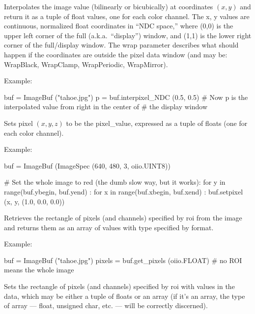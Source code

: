 Interpolates the image value (bilinearly or bicubically)
at coordinates $(x,y)$ and return it as a tuple
of {\cf float} values, one for each color channel.  The {\cf x, y} values
are continuous, normalized {\cf float} coordinates in ``NDC space,'' where
{\cf (0,0)} is the upper left corner of the full (a.k.a.\ ``display'')
window, and {\cf (1,1)} is the lower right corner of the full/display
window. The  {\cf wrap} parameter describes what should happen if the
coordinates are outside the pixel data window (and may be: {\cf WrapBlack,
WrapClamp, WrapPeriodic, WrapMirror}).

\noindent Example:
\begin{code}
    buf = ImageBuf ("tahoe.jpg")
    p = buf.interpixel_NDC (0.5, 0.5)
    # Now p is the interpolated value from right in the center of
    # the display window
\end{code}
\apiend

Sets pixel $(x,y,z)$ to be the {\cf pixel_value}, expressed as a tuple of
{\cf float}s (one for each color channel).

\noindent Example:
\begin{code}
    buf = ImageBuf (ImageSpec (640, 480, 3, oiio.UINT8))

    # Set the whole image to red (the dumb slow way, but it works):
    for y in range(buf.ybegin, buf.yend) :
        for x in range(buf.xbegin, buf.xend) :
            buf.setpixel (x, y, (1.0, 0.0, 0.0))
\end{code}
\apiend


Retrieves the rectangle of pixels (and channels) specified by {\cf roi} from
the image and returns them as an array of values with type specified by
{\cf format}.

\noindent Example:
\begin{code}
    buf = ImageBuf ("tahoe.jpg")
    pixels = buf.get_pixels (oiio.FLOAT)  # no ROI means the whole image
\end{code}
\apiend


Sets the rectangle of pixels (and channels) specified by {\cf roi} with
values in the {\cf data}, which may be either a tuple of floats or an array
(if it's an array, the type of array --- float, unsigned char, etc. ---
will be correctly discerned).

